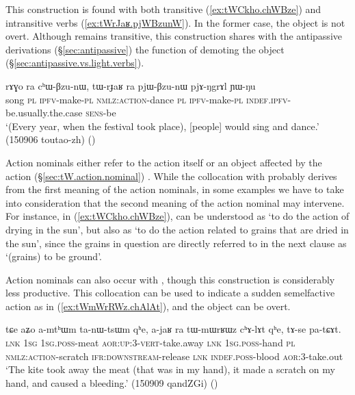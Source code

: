 This construction is found with both transitive (\ref{ex:tWCkho.chWBze}) and intransitive verbs (\ref{ex:tWrJaʁ.pjWBzunW}). In the former case, the object is not overt. Although  remains transitive, this construction shares with the antipassive derivations (§\ref{sec:antipassive}) the function of demoting the object (§\ref{sec:antipassive.vs.light.verbs}).

\begin{exe}
	\ex \label{ex:tWrJaʁ.pjWBzunW}
	\gll rɤɣo ra cʰɯ-βzu-nɯ, tɯ-rɟaʁ ra pjɯ-βzu-nɯ pjɤ-ŋgrɤl ɲɯ-ŋu \\
	song \textsc{pl} \textsc{ipfv}-make-\textsc{pl} \textsc{nmlz}:\textsc{action}-dance \textsc{pl} \textsc{ipfv}-make-\textsc{pl} \textsc{indef}.\textsc{ipfv}-be.usually.the.case \textsc{sens}-be \\
	\glt `(Every year, when the festival took place), [people] would sing and dance.' (150906 toutao-zh)
	()
\end{exe}

Action nominals either refer to the action itself or an object affected by the action (§\ref{sec:tW.action.nominal}) . While the collocation with  probably derives from the first meaning of the action nominals, in some examples we have to take into consideration that the second meaning of the action nominal may intervene. For instance, in (\ref{ex:tWCkho.chWBze}),  can be understood as `to do the action of drying in the sun', but also as `to do the action related to grains that are dried in the sun', since the grains in question are directly referred to in the next clause as  `(grains) to be ground'.

Action nominals can also occur with , though this construction is considerably less productive. This collocation can be used to indicate a sudden semelfactive action as in (\ref{ex:tWmWrRWz.chAlAt}), and the object can be overt.

\begin{exe}
	\ex \label{ex:tWmWrRWz.chAlAt}
	\gll    tɕe aʑo a-mtʰɯm ta-nɯ-tsɯm qʰe, a-jaʁ ra tɯ-mɯrʁɯz cʰɤ-lɤt qʰe, tɤ-se pa-tɕɤt.  \\
	\textsc{lnk} \textsc{1sg} \textsc{1sg}.\textsc{poss}-meat \textsc{aor}:\textsc{up}:3\flobv{}-\textsc{vert}-take.away  \textsc{lnk} \textsc{1sg}.\textsc{poss}-hand \textsc{pl} \textsc{nmlz}:\textsc{action}-scratch \textsc{ifr}:\textsc{downstream}-release \textsc{lnk} \textsc{indef}.\textsc{poss}-blood \textsc{aor}:3\flobv{}-take.out \\
	\glt  `The kite took away the meat (that was in my hand), it made a scratch on my hand, and caused a bleeding.' (150909 qandZGi)
()
\end{exe}

